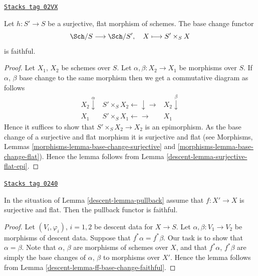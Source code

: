 \begin{lemma}
\label{descent-lemma-ff-base-change-faithful}
\href{https://stacks.math.columbia.edu/tag/02VX}{\texttt{Stacks tag 02VX}}

Let $h : S' \to S$ be a surjective, flat morphism of
schemes. The base change functor
$$
\Sch/S \longrightarrow \Sch/S', \quad
X \longmapsto S' \times_S X
$$
is faithful.
\end{lemma}

\begin{proof}

Let $X_1$, $X_2$ be schemes over $S$.
Let $\alpha, \beta : X_2 \to X_1$ be morphisms over $S$.
If $\alpha$, $\beta$ base change to the same morphism then
we get a commutative diagram as follows
$$
\begin{array}{ccc}X_2 \overset{\alpha}{\downarrow} & S' \times_S X_2 \longleftarrow\downarrow\longrightarrow & X_2 \overset{\beta}{\downarrow} \\ X_1 & S' \times_S X_1 \longleftarrow\longrightarrow & X_1\end{array}
$$
Hence it suffices to show that $S' \times_S X_2 \to X_2$
is an epimorphism. As the base change of a surjective and
flat morphism it is surjective and flat (see
Morphisms, Lemmas \ref{morphisms-lemma-base-change-surjective}
and \ref{morphisms-lemma-base-change-flat}). Hence the lemma follows
from Lemma \ref{descent-lemma-surjective-flat-epi}.
\end{proof}

\begin{lemma}[Faithful]
\label{descent-lemma-faithful}
\href{https://stacks.math.columbia.edu/tag/0240}{\texttt{Stacks tag 0240}}

In the situation of Lemma \ref{descent-lemma-pullback}
assume that $f : X' \to X$ is surjective
and flat. Then the pullback functor is faithful.
\end{lemma}

\begin{proof}

Let $(V_i, \varphi_i)$, $i = 1, 2$ be descent data for $X \to S$.
Let $\alpha, \beta : V_1 \to V_2$ be morphisms of descent data.
Suppose that $f^*\alpha = f^*\beta$. Our task is to show that
$\alpha = \beta$. Note that $\alpha$, $\beta$ are morphisms
of schemes over $X$, and that $f^*\alpha$, $f^*\beta$ are
simply the base changes of $\alpha$, $\beta$ to morphisms over
$X'$. Hence the lemma follows from Lemma \ref{descent-lemma-ff-base-change-faithful}.
\end{proof}

